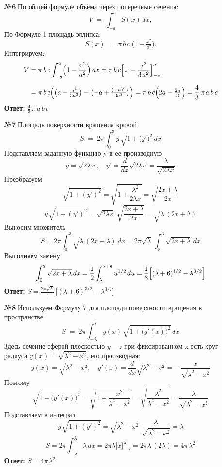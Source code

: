 \documentclass[a4paper]{article}
\begin{document}
\begin{enumerate}
  \item[\textbf{№6}]По общей формуле объёма через поперечные сечения:
  \[
  V \;=\;\int_{-a}^{a} S(x)\,dx,
  \]
  По Формуле 1 площадь эллипса:
  \[
  S(x) \;=\;\pi\,b\,c\;\bigl(1 - \tfrac{x^2}{a^2}\bigr).
  \]
  Интегрируем:
  \[
  \begin{aligned}
  V &= \pi\,b\,c \int_{-a}^{a} \Bigl(1 - \frac{x^2}{a^2}\Bigr)\,dx
      = \pi\,b\,c \Bigl[\,x - \frac{x^3}{3\,a^2}\Bigr]_{-a}^{a} \\[6pt]
    &= \pi\,b\,c \Bigl(\bigl(a - \tfrac{a^3}{3a^2}\bigr) - \bigl(-a + \tfrac{(-a)^3}{3a^2}\bigr)\Bigr)
      = \pi\,b\,c \Bigl(2a - \tfrac{2a}{3}\Bigr)
      = \frac{4}{3}\,\pi\,a\,b\,c
  \end{aligned}
  \]
  \textbf{Ответ: } $\frac{4}{3}\,\pi\,a\,b\,c$\\

  \item[\textbf{№7}]Площадь поверхности вращения кривой
  \[
  S \;=\; 2\pi \int_{0}^{3} y\,\sqrt{1 + \bigl(y'\bigr)^2}\,dx
  \]
  Подставляем заданную функцию y и ее производную
  \[
  y = \sqrt{2\lambda x}, 
  \quad
  y' = \frac{d}{dx}\sqrt{2\lambda x}
        = \frac{\lambda}{\sqrt{2\lambda x}}
  \]
  Преобразуем 
  \[
  \sqrt{1 + (y')^2}
  = \sqrt{1 + \frac{\lambda^2}{2\lambda x}}
  = \sqrt{\frac{2x + \lambda}{2x}}
  \]
  \[
  y\,\sqrt{1+(y')^2}
  = \sqrt{2\lambda x}\;\sqrt{\frac{2x + \lambda}{2x}}
  = \sqrt{\lambda\,(2x + \lambda)}
  \]
  Выносим множитель
  \[
  S = 2\pi \int_{0}^{3} \sqrt{\lambda\,(2x + \lambda)}\,dx
      = 2\pi\sqrt{\lambda}\,\int_{0}^{3} \sqrt{2x + \lambda}\,dx
  \]
  Выполняем замену
  \[
  \int_{0}^{3} \sqrt{2x + \lambda}\,dx
  = \frac{1}{2}\int_{\lambda}^{\lambda+6} u^{1/2}\,du
  = \frac{1}{3}\Bigl[(\lambda+6)^{3/2} - \lambda^{3/2}\Bigr]
  \]
  \textbf{Ответ: } $S = \frac{2\pi\sqrt{\lambda}}{3}\,\bigl[(\lambda + 6)^{3/2} - \lambda^{3/2}\bigr]$\\

  \item[\textbf{№8}]Используем Формулу 7 для площади поверхности вращения в пространстве 
  \[
  S \;=\; 2\pi \int_{-\,\lambda}^{\lambda} y(x)\,\sqrt{1 + \bigl(y'(x)\bigr)^2}\,dx
  \]
  Здесь сечение сферой плоскостью $y-z$ при фиксированном 
  x есть круг радиуса $y(x)=\sqrt{\lambda^2 - x^2}$, его производная:
  \[
  y(x) = \sqrt{\lambda^2 - x^2}, 
  \quad
  y'(x) = \frac{d}{dx}\sqrt{\lambda^2 - x^2} = -\,\frac{x}{\sqrt{\lambda^2 - x^2}}
  \]
  Поэтому  
  \[
  \sqrt{1 + \bigl(y'(x)\bigr)^2}
  = \sqrt{1 + \frac{x^2}{\lambda^2 - x^2}}
  = \sqrt{\frac{\lambda^2}{\lambda^2 - x^2}}
  = \frac{\lambda}{\sqrt{\lambda^2 - x^2}}
  \]
  Подставляем в интеграл 
  \[
  y\,\sqrt{1 + (y')^2}
  = \sqrt{\lambda^2 - x^2}\;\frac{\lambda}{\sqrt{\lambda^2 - x^2}}
  = \lambda
  \]
  \[
  S = 2\pi \int_{-\,\lambda}^{\lambda} \lambda \,dx
      = 2\pi\lambda \bigl[x\bigr]_{-\,\lambda}^{\lambda}
      = 2\pi\lambda\,(2\lambda)
      = 4\pi\,\lambda^2
  \]
  \textbf{Ответ: } $S = 4\pi\,\lambda^2$\\


\end{enumerate}
\end{document}
